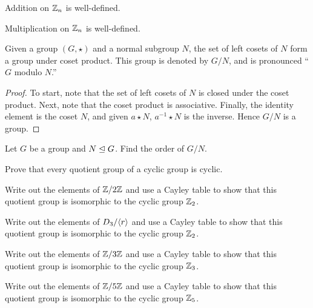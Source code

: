 \documentclass{ximera}
\begin{document}
\begin{corollary}
  Addition on $\mathbb Z_n$ is well-defined.
\end{corollary}


\begin{corollary}
  Multiplication on $\mathbb Z_n$ is well-defined.
\end{corollary}


\begin{theorem}\label{T:quotient}
  Given a group $(G,\star)$ and a normal subgroup $N$, the set of left
  cosets of $N$ form a group under coset product. This group is
  denoted by $G/N$, and is pronounced ``$G$ modulo $N$.''
  \begin{proof}
    To start, note that the set of left cosets of $N$ is closed under
    the coset product. Next, note that the coset product is
    associative. Finally, the identity element is the coset $N$, and
    given $a\star N$, $a^{-1}\star N$ is the inverse. Hence $G/N$ is a
    group.
  \end{proof}
\end{theorem}

\begin{exercise}
  Let $G$ be a group and $N\trianglelefteq G$. Find the order of $G/N$.
\end{exercise}


\begin{exercise}
  Prove that every quotient group of a cyclic group is cyclic.
\end{exercise}


\begin{exercise}
  Write out the elements of $\mathbb Z/2\mathbb Z$ and use a Cayley table to show
  that this quotient group is isomorphic to the cyclic group $\mathbb Z_2$.
\end{exercise}


\begin{exercise}
  Write out the elements of $D_3/\langle r\rangle$ and use a Cayley table to show
  that this quotient group is isomorphic to the cyclic group $\mathbb Z_2$.
\end{exercise}


\begin{exercise}
  Write out the elements of $\mathbb Z/3\mathbb Z$ and use a Cayley table to show
  that this quotient group is isomorphic to the cyclic group $\mathbb Z_3$.
\end{exercise}


\begin{exercise}
  Write out the elements of $\mathbb Z/5\mathbb Z$ and use a Cayley table to show
  that this quotient group is isomorphic to the cyclic group $\mathbb Z_5$.
\end{exercise}
\end{document}
